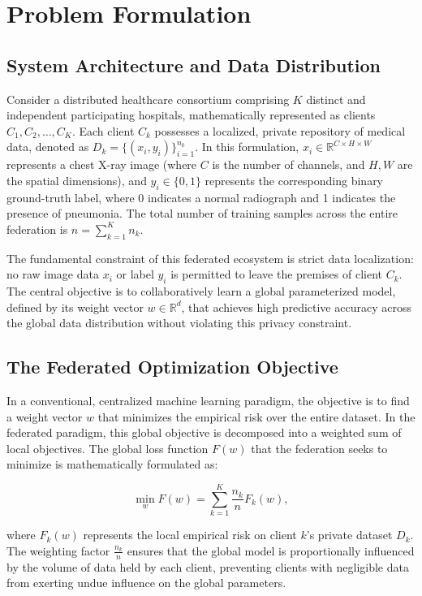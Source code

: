 \documentclass[12pt,a4paper]{report}
\begin{document}
\chapter{Problem Formulation}

\section{System Architecture and Data Distribution}

Consider a distributed healthcare consortium comprising $K$ distinct and independent participating hospitals, mathematically represented as clients $C_1, C_2, \ldots, C_K$. Each client $C_k$ possesses a localized, private repository of medical data, denoted as $D_k = \{(x_i, y_i)\}_{i=1}^{n_k}$. In this formulation, $x_i \in \mathbb{R}^{C \times H \times W}$ represents a chest X-ray image (where $C$ is the number of channels, and $H, W$ are the spatial dimensions), and $y_i \in \{0, 1\}$ represents the corresponding binary ground-truth label, where 0 indicates a normal radiograph and 1 indicates the presence of pneumonia. The total number of training samples across the entire federation is $n = \sum_{k=1}^{K} n_k$.

The fundamental constraint of this federated ecosystem is strict data localization: no raw image data $x_i$ or label $y_i$ is permitted to leave the premises of client $C_k$. The central objective is to collaboratively learn a global parameterized model, defined by its weight vector $w \in \mathbb{R}^d$, that achieves high predictive accuracy across the global data distribution without violating this privacy constraint.

\section{The Federated Optimization Objective}

In a conventional, centralized machine learning paradigm, the objective is to find a weight vector $w$ that minimizes the empirical risk over the entire dataset. In the federated paradigm, this global objective is decomposed into a weighted sum of local objectives. The global loss function $F(w)$ that the federation seeks to minimize is mathematically formulated as:

\begin{equation}
\min_w F(w) = \sum_{k=1}^{K} \frac{n_k}{n} F_k(w),
\end{equation}

where $F_k(w)$ represents the local empirical risk on client $k$'s private dataset $D_k$. The weighting factor $\frac{n_k}{n}$ ensures that the global model is proportionally influenced by the volume of data held by each client, preventing clients with negligible data from exerting undue influence on the global parameters.
\end{document}
